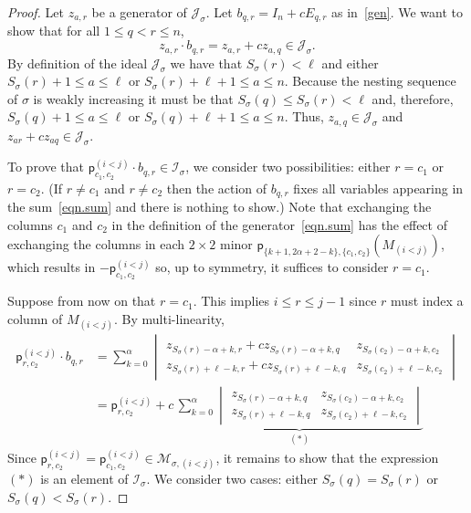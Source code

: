 \documentclass[11pt]{amsart}
\theoremstyle{remark}
\theoremstyle{remark}
\theoremstyle{definition}
\theoremstyle{definition}
\theoremstyle{definition}
\numberwithin{equation}{section}
\newcommand{\gs}{\sigma}
\newcommand{\ci}{\mathcal{I}}
\newcommand{\cj}{\mathcal{J}}
\newcommand{\cm}{\mathcal{M}}
\newcommand{\al}{\alpha}
\newcommand{\pl}{\mathsf{p}}
\begin{document}
\begin{proof}
Let $z_{a,r}$ be a generator of $\cj_\gs$. Let $b_{q,r}=I_n+cE_{q,r}$ as in~\eqref{gen}. We want to show that for all $1\leq q<r \leq n$,  
\[
z_{a,r}\cdot b_{q,r}= z_{a,r}+cz_{a,q}\in \cj_\gs.
\]
By definition of the ideal $\cj_\gs$ we have that $S_\gs(r)<\ell$ and either  $S_\gs(r)+1\leq a \leq \ell$  or  $S_\gs(r)+\ell+1\leq a \leq n$. Because the nesting sequence of $\gs$ is weakly increasing it must be that $S_\gs(q)\leq S_\gs(r)<\ell$ and, therefore, $S_\gs(q)+1\leq a\leq \ell$ or $S_\gs(q)+\ell+1\leq a\leq n$.  Thus, $z_{a,q} \in\cj_\gs$ and $z_{ar}+cz_{aq}\in \cj_\gs$.




To prove that $\pl_{c_1,c_2}^{(i<j)}\cdot b_{q,r}\in \ci_\gs$, we consider two possibilities: either $r=c_1$ or $r=c_2$. (If $r\neq c_1$ and $r\neq c_2$ then the action of $b_{q,r}$ fixes all variables appearing in the sum~\eqref{eqn.sum} and there is nothing to show.) Note that exchanging the columns $c_1$ and $c_2$ in the definition of the generator~\eqref{eqn.sum} has the effect of exchanging the columns in each $2\times 2$ minor $\pl_{\{k+1, 2\al + 2-k\},\{c_1,c_2\}}(M_{(i<j)})$, which results in $-\pl_{c_1,c_2}^{(i<j)}$ so, up to symmetry, it suffices to consider $r=c_1$. 



Suppose from now on that $r=c_1$. This implies $i\leq r \leq j-1$ since $r$ must index a column of $M_{(i<j)}$. By multi-linearity,
\begin{align*}
  \pl_{r,c_2}^{(i<j)}\cdot b_{q,r} &= \sum_{k=0}^{\al}\begin{vmatrix}
    z_{S_\sigma(r)-\al+k, r}+ cz_{S_\sigma(r)-\al+k, q}&z_{S_\sigma(c_2)-\al+k, c_2}\\
 z_{S_\sigma(r)+\ell-k, r}+ cz_{S_\sigma(r)+\ell-k, q} &  z_{S_\sigma(c_2)+\ell-k, c_2}
\end{vmatrix} \\
   &=  \pl_{ r,c_2}^{(i<j)}+c\,\underbrace{\displaystyle\sum_{k=0}^{\al}\begin{vmatrix}
    z_{S_\sigma(r)-\al+k, q}&z_{S_\sigma(c_2)-\al+k, c_2}\\
    z_{S_\gs(r)+\ell-k, q} &  z_{S_\gs(c_2)+\ell-k, c_2}
\end{vmatrix}}_{(*)}
\end{align*}
Since $\pl_{r,c_2}^{(i<j)} = \pl_{c_1,c_2}^{(i<j)}\in\cm_{\gs,(i<j)}$, it remains to show that the expression $(*)$ is an element of $\ci_\sigma$. We consider two cases: either $S_\gs(q)=S_\gs(r)$ or $S_\gs(q)<S_\gs(r)$.




\end{proof}
\end{document}
